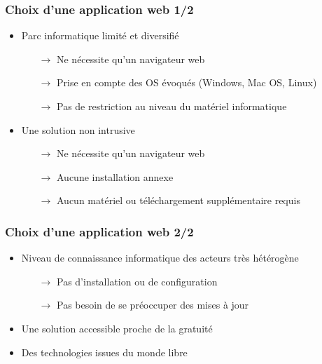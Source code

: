 \begin{frame}
  \frametitle{Choix d'une application web 1/2}
  \begin{itemize}
    \item Parc informatique limité et diversifié
      \begin{itemize}
        \item[$\rightarrow $] Ne nécessite qu'un navigateur web
        \item[$\rightarrow $] Prise en compte des OS évoqués (Windows, Mac OS, Linux)
        \item[$\rightarrow $] Pas de restriction au niveau du matériel informatique
      \end{itemize}
    \item Une solution non intrusive
      \begin{itemize}
        \item[$\rightarrow $] Ne nécessite qu'un navigateur web
        \item[$\rightarrow $] Aucune installation annexe
        \item[$\rightarrow $] Aucun matériel ou téléchargement supplémentaire requis
      \end{itemize}
\end{itemize}
\end{frame}

\begin{frame}
  \frametitle{Choix d'une application web 2/2}
  \begin{itemize}
    \item Niveau de connaissance informatique des acteurs très hétérogène
      \begin{itemize}
        \item[$\rightarrow $] Pas d'installation ou de configuration
        \item[$\rightarrow $] Pas besoin de se préoccuper des mises à jour
      \end{itemize}
    \item Une solution accessible proche de la gratuité
    \item Des technologies issues du monde libre
  \end{itemize}
\end{frame}

